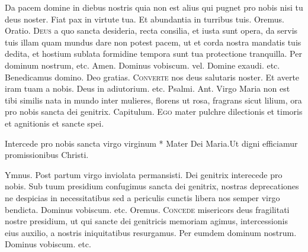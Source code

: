 \begin{multicols*}{2}
 Da pacem domine in diebus nostris quia non est alius qui pugnet pro nobis nisi tu deus noster. \V Fiat pax in virtute tua. \R Et abundantia in turribus tuis. Oremus. {\color{Red} Oratio.}
\lettrine[lines=2]{\zallmancaps \color{Blue} D}{eus} a quo sancta desideria, recta consilia, et iusta sunt opera, da servis tuis illam quam mundus dare non potest pacem, ut et corda nostra mandatis tuis dedita, et hostium sublata formidine tempora sunt tua protectione tranquilla. Per dominum nostrum, etc. Amen. Dominus vobiscum. {\color{Red} vel.} Domine exaudi. etc. Benedicamus domino. Deo gratias.
{\color{Red} }
\lettrine[lines=2]{\zallmancaps \color{Red} C}{onverte} nos deus salutaris noster. Et averte iram tuam a nobis. Deus in adiutorium. etc. {\color{Red} Psalmi.}
{\color{Red} Ant.} Virgo Maria non est tibi similis nata in mundo inter mulieres, florens ut rosa, fragrans sicut lilium, ora pro nobis sancta dei genitrix. {\color{Red} Capitulum.}
\lettrine[lines=2]{\zallmancaps \color{Blue} E}{go} mater pulchre dilectionis et timoris et agnitionis et sancte spei.
\begin{responsory-breve}
{Intercede pro nobis sancta virgo virginum * Mater Dei Maria.}{Ut digni efficiamur promissionibus Christi.}
\end{responsory-breve}
{\color{Red} Ymnus.}
\newline \V Post partum virgo inviolata permansisti.
\newline \R Dei genitrix interecede pro nobis.
 Sub tuum presidium confugimus sancta dei genitrix, nostras deprecationes ne despicias in necessitatibus sed a periculis cunctis libera nos semper virgo bendicta. Dominus vobiscum. etc. Oremus.
\lettrine[lines=2]{\zallmancaps \color{Blue} C}{oncede} misericors deus fragilitati nostre presidium, ut qui sancte dei genitricis memoriam agimus, intercessionis eius auxilio, a nostris iniquitatibus resurgamus. Per eumdem dominum nostrum. Dominus vobiscum. etc.

\end{multicols*}
